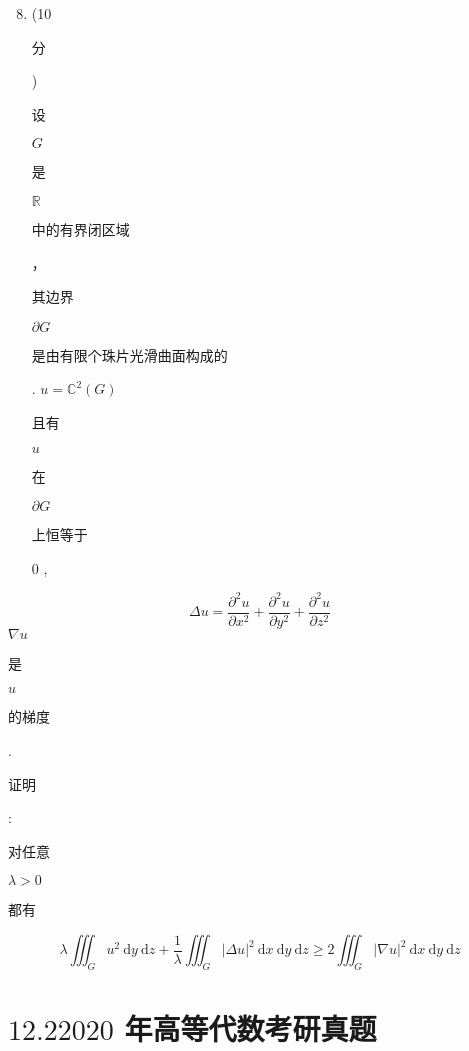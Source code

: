 \documentclass[10pt]{article}
\begin{document}
\begin{enumerate}
  \setcounter{enumi}{7}
  \item (10 \begin{CJK}{UTF8}{mj}分\end{CJK}) \begin{CJK}{UTF8}{mj}设\end{CJK} $G$ \begin{CJK}{UTF8}{mj}是\end{CJK} $\mathbb{R}$ \begin{CJK}{UTF8}{mj}中的有界闭区域\end{CJK}，\begin{CJK}{UTF8}{mj}其边界\end{CJK} $\partial G$ \begin{CJK}{UTF8}{mj}是由有限个珠片光滑曲面构成的\end{CJK}. $u=\mathbb{C}^{2}(G)$ \begin{CJK}{UTF8}{mj}且有\end{CJK} $u$ \begin{CJK}{UTF8}{mj}在\end{CJK} $\partial G$ \begin{CJK}{UTF8}{mj}上恒等于\end{CJK} 0 ,
\end{enumerate}
$$
\Delta u=\frac{\partial^{2} u}{\partial x^{2}}+\frac{\partial^{2} u}{\partial y^{2}}+\frac{\partial^{2} u}{\partial z^{2}}
$$
$\nabla u$ \begin{CJK}{UTF8}{mj}是\end{CJK} $u$ \begin{CJK}{UTF8}{mj}的梯度\end{CJK}. \begin{CJK}{UTF8}{mj}证明\end{CJK}: \begin{CJK}{UTF8}{mj}对任意\end{CJK} $\lambda>0$ \begin{CJK}{UTF8}{mj}都有\end{CJK}
$$
\lambda \iiint_{G} u^{2} \mathrm{~d} y \mathrm{~d} z+\frac{1}{\lambda} \iiint_{G}|\Delta u|^{2} \mathrm{~d} x \mathrm{~d} y \mathrm{~d} z \geq 2 \iiint_{G}|\nabla u|^{2} \mathrm{~d} x \mathrm{~d} y \mathrm{~d} z
$$

\section{$12.22020$ 年高等代数考研真题}
\end{document}
